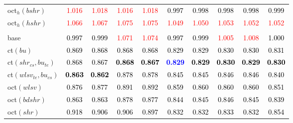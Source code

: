 \begin{tabular}[t]{l|ccccccccc}
oct$_h(bshr)$ & \textcolor{red}{1.016} & \textcolor{red}{1.018} & \textcolor{red}{1.016} & \textcolor{red}{1.018} & \textcolor{black}{0.997} & \textcolor{black}{0.998} & \textcolor{black}{0.998} & \textcolor{black}{0.998} & \textcolor{black}{0.999}\\
oct$_h(hshr)$ & \textcolor{red}{1.066} & \textcolor{red}{1.067} & \textcolor{red}{1.075} & \textcolor{red}{1.075} & \textcolor{red}{1.049} & \textcolor{red}{1.050} & \textcolor{red}{1.053} & \textcolor{red}{1.052} & \textcolor{red}{1.052}\\
\addlinespace[0.3em]
\multicolumn{10}{c}{\textbf{$k = 2$}}\\
base & \textcolor{black}{0.997} & \textcolor{black}{0.999} & \textcolor{red}{1.071} & \textcolor{red}{1.074} & \textcolor{black}{0.997} & \textcolor{black}{0.999} & \textcolor{red}{1.005} & \textcolor{red}{1.008} & \textcolor{black}{1.000}\\
ct$(bu)$ & \textcolor{black}{0.869} & \textcolor{black}{0.868} & \textcolor{black}{0.868} & \textcolor{black}{0.868} & \textcolor{black}{0.829} & \textcolor{black}{0.829} & \textcolor{black}{0.830} & \textcolor{black}{0.830} & \textcolor{black}{0.831}\\
ct$(shr_{cs}, bu_{te})$ & \textcolor{black}{0.868} & \textcolor{black}{0.867} & \textcolor{black}{\textbf{0.868}} & \textcolor{black}{\textbf{0.867}} & \textcolor{blue}{\textbf{0.829}} & \textcolor{black}{\textbf{0.829}} & \textcolor{black}{\textbf{0.830}} & \textcolor{black}{\textbf{0.829}} & \textcolor{black}{\textbf{0.830}}\\
ct$(wlsv_{te}, bu_{cs})$ & \textcolor{black}{\textbf{0.863}} & \textcolor{black}{\textbf{0.862}} & \textcolor{black}{0.878} & \textcolor{black}{0.878} & \textcolor{black}{0.845} & \textcolor{black}{0.845} & \textcolor{black}{0.846} & \textcolor{black}{0.846} & \textcolor{black}{0.840}\\
oct$(wlsv)$ & \textcolor{black}{0.876} & \textcolor{black}{0.877} & \textcolor{black}{0.891} & \textcolor{black}{0.892} & \textcolor{black}{0.859} & \textcolor{black}{0.860} & \textcolor{black}{0.860} & \textcolor{black}{0.860} & \textcolor{black}{0.851}\\
oct$(bdshr)$ & \textcolor{black}{0.863} & \textcolor{black}{0.863} & \textcolor{black}{0.878} & \textcolor{black}{0.877} & \textcolor{black}{0.844} & \textcolor{black}{0.845} & \textcolor{black}{0.846} & \textcolor{black}{0.845} & \textcolor{black}{0.839}\\
oct$(shr)$ & \textcolor{black}{0.918} & \textcolor{black}{0.906} & \textcolor{black}{0.906} & \textcolor{black}{0.897} & \textcolor{black}{0.832} & \textcolor{black}{0.832} & \textcolor{black}{0.833} & \textcolor{black}{0.832} & \textcolor{black}{0.854}\\

\end{tabular}
